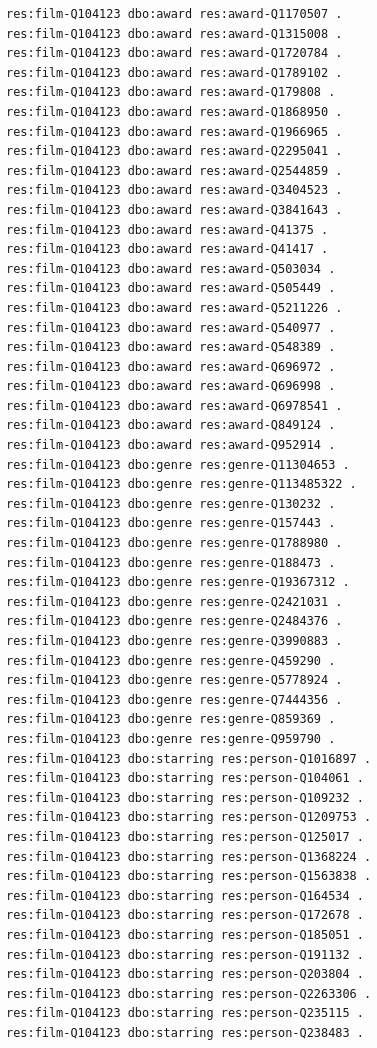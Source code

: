 \documentclass[
  11pt,
]{article}
\begin{document}
\begin{verbatim}
res:film-Q104123 dbo:award res:award-Q1170507 .
res:film-Q104123 dbo:award res:award-Q1315008 .
res:film-Q104123 dbo:award res:award-Q1720784 .
res:film-Q104123 dbo:award res:award-Q1789102 .
res:film-Q104123 dbo:award res:award-Q179808 .
res:film-Q104123 dbo:award res:award-Q1868950 .
res:film-Q104123 dbo:award res:award-Q1966965 .
res:film-Q104123 dbo:award res:award-Q2295041 .
res:film-Q104123 dbo:award res:award-Q2544859 .
res:film-Q104123 dbo:award res:award-Q3404523 .
res:film-Q104123 dbo:award res:award-Q3841643 .
res:film-Q104123 dbo:award res:award-Q41375 .
res:film-Q104123 dbo:award res:award-Q41417 .
res:film-Q104123 dbo:award res:award-Q503034 .
res:film-Q104123 dbo:award res:award-Q505449 .
res:film-Q104123 dbo:award res:award-Q5211226 .
res:film-Q104123 dbo:award res:award-Q540977 .
res:film-Q104123 dbo:award res:award-Q548389 .
res:film-Q104123 dbo:award res:award-Q696972 .
res:film-Q104123 dbo:award res:award-Q696998 .
res:film-Q104123 dbo:award res:award-Q6978541 .
res:film-Q104123 dbo:award res:award-Q849124 .
res:film-Q104123 dbo:award res:award-Q952914 .
res:film-Q104123 dbo:genre res:genre-Q11304653 .
res:film-Q104123 dbo:genre res:genre-Q113485322 .
res:film-Q104123 dbo:genre res:genre-Q130232 .
res:film-Q104123 dbo:genre res:genre-Q157443 .
res:film-Q104123 dbo:genre res:genre-Q1788980 .
res:film-Q104123 dbo:genre res:genre-Q188473 .
res:film-Q104123 dbo:genre res:genre-Q19367312 .
res:film-Q104123 dbo:genre res:genre-Q2421031 .
res:film-Q104123 dbo:genre res:genre-Q2484376 .
res:film-Q104123 dbo:genre res:genre-Q3990883 .
res:film-Q104123 dbo:genre res:genre-Q459290 .
res:film-Q104123 dbo:genre res:genre-Q5778924 .
res:film-Q104123 dbo:genre res:genre-Q7444356 .
res:film-Q104123 dbo:genre res:genre-Q859369 .
res:film-Q104123 dbo:genre res:genre-Q959790 .
res:film-Q104123 dbo:starring res:person-Q1016897 .
res:film-Q104123 dbo:starring res:person-Q104061 .
res:film-Q104123 dbo:starring res:person-Q109232 .
res:film-Q104123 dbo:starring res:person-Q1209753 .
res:film-Q104123 dbo:starring res:person-Q125017 .
res:film-Q104123 dbo:starring res:person-Q1368224 .
res:film-Q104123 dbo:starring res:person-Q1563838 .
res:film-Q104123 dbo:starring res:person-Q164534 .
res:film-Q104123 dbo:starring res:person-Q172678 .
res:film-Q104123 dbo:starring res:person-Q185051 .
res:film-Q104123 dbo:starring res:person-Q191132 .
res:film-Q104123 dbo:starring res:person-Q203804 .
res:film-Q104123 dbo:starring res:person-Q2263306 .
res:film-Q104123 dbo:starring res:person-Q235115 .
res:film-Q104123 dbo:starring res:person-Q238483 .

\end{verbatim}
\end{document}
